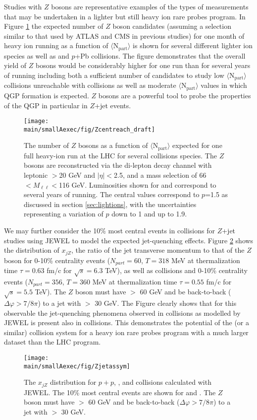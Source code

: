 Studies with $Z$ bosons are representative examples of the types of measurements that may be undertaken in a lighter but still heavy ion rare probes program.  In Figure \ref{fig:Zreach} the expected number of $Z$ boson candidates (assuming a selection similar to that used by ATLAS and CMS in previous studies) for one month of heavy ion running  as a function of $\langle \mathrm{N_{part}}\rangle$ is shown for several different lighter ion species as well as \PbPb and $p$+Pb collisions.  The figure demonstrates that the overall yield of $Z$ bosons would be considerably higher for one \ArAr run than for several years of \PbPb running including both a sufficient number of candidates to study low $\langle \mathrm{N_{part}}\rangle$ collisions unreachable with \PbPb collisions as well as moderate $\langle \mathrm{N_{part}}\rangle$ values in which QGP formation is expected.  $Z$ bosons are a powerful tool to probe the properties of the QGP in particular in $Z$+jet events.  
\begin{figure}
\centering
\texttt{[image: \\main/smallAexec/fig/Zcentreach\_draft]}
\caption{
The number of $Z$ bosons as a function of $\langle \mathrm{N_{part}}\rangle$ expected for one full heavy-ion run at the LHC for several collisions species.  The $Z$ bosons are reconstructed via the di-lepton decay channel with leptonic \pT$>$20 GeV and $|\eta|<$2.5, and a mass selection of 66$<M_{\ell\ell}<$116 GeV.  Luminosities shown for \PbPb and \pPb correspond to several years of running.  The central values correspond to $p$=1.5 as discussed in section \ref{sec:lightions}, with the uncertainties representing a variation of $p$ down to 1 and up to 1.9.
\label{fig:Zreach}}
\end{figure}

We may further consider the 10\% most central events in \ArAr collisions for $Z$+jet studies using JEWEL \cite{Zapp:2009ud} to model the expected jet-quenching effects.  Figure \ref{fig:ArAr_xjz} shows the distribution of $x_{jZ}$, the ratio of the jet transverse momentum to that of the $Z$ boson for 0-10\% centrality \ArAr events ($N_{part} = 60$, $T=318$ MeV at thermalization time $\tau = 0.63$ fm/c for $\sqrt{s}=6.3$ TeV), as well as \pp collisions and 0-10\% centrality \PbPb events ($N_{part} = 356$, $T=360$ MeV at thermalization time $\tau = 0.55$ fm/c for $\sqrt{s}=5.5$ TeV).  The $Z$ boson must have \pt $>$ 60 GeV and be back-to-back ($\Delta\varphi > 7/8\pi$) to a jet with \pt $>$ 30 GeV.  The Figure clearly shows that for this observable the jet-quenching phenomena observed in \PbPb collisions as modelled by JEWEL is present also in \ArAr collisions.  This demonstrates the potential of the \ArAr (or a similar) collision system for a heavy ion rare probes program with a much larger dataset than the LHC \PbPb program.
\begin{figure}
\centering
\texttt{[image: \\main/smallAexec/fig/Zjetassym]}
\caption{
The $x_{jZ}$ distribution for $p+p$, \PbPb, and \ArAr collisions calculated with JEWEL.  The 10\% most central events are shown for \PbPb and \ArAr.  The $Z$ boson must have \pt $>$ 60 GeV and be back-to-back ($\Delta\varphi > 7/8\pi$) to a jet with \pt $>$ 30 GeV.    
\label{fig:ArAr_xjz}}
\end{figure}
